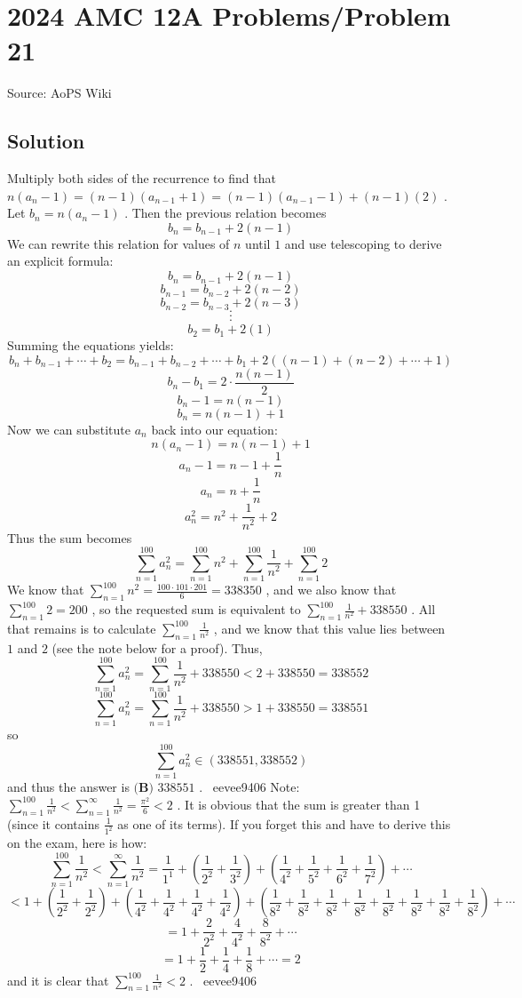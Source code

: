 \documentclass[12pt]{article}
\begin{document}
\section*{{2024 AMC 12A Problems/Problem 21}}
Source: AoPS Wiki

\subsection*{Solution}
Multiply both sides of the recurrence to find that $n(a_n-1)=(n-1)(a_{n-1}+1)=(n-1)(a_{n-1}-1)+(n-1)(2)$ . Let $b_n=n(a_n-1)$ . Then the previous relation becomes \[b_n=b_{n-1}+2(n-1)\] We can rewrite this relation for values of $n$ until $1$ and use telescoping to derive an explicit formula: \[b_n=b_{n-1}+2(n-1)\] \[b_{n-1}=b_{n-2}+2(n-2)\] \[b_{n-2}=b_{n-3}+2(n-3)\] \[\cdot\] \[\cdot\] \[\cdot\] \[b_2=b_1+2(1)\] Summing the equations yields: \[b_n+b_{n-1}+\cdots+b_2=b_{n-1}+b_{n-2}+\cdots+b_1+2((n-1)+(n-2)+\cdots+1)\] \[b_n-b_1=2\cdot\frac{n(n-1)}{2}\] \[b_n-1=n(n-1)\] \[b_n=n(n-1)+1\] Now we can substitute $a_n$ back into our equation: \[n(a_n-1)=n(n-1)+1\] \[a_n-1=n-1+\frac{1}{n}\] \[a_n=n+\frac{1}{n}\] \[a_n^2=n^2+\frac{1}{n^2}+2\] Thus the sum becomes \[\sum^{100}_{n=1} a_n^2= \sum^{100}_{n=1} n^2+ \sum^{100}_{n=1} \frac{1}{n^2}+ \sum^{100}_{n=1} 2\] We know that $\sum^{100}_{n=1} n^2=\frac{100\cdot101\cdot201}{6}=338350$ , and we also know that $\sum^{100}_{n=1} 2=200$ , so the requested sum is equivalent to $\sum^{100}_{n=1} \frac{1}{n^2}+338550$ . All that remains is to calculate $\sum^{100}_{n=1} \frac{1}{n^2}$ , and we know that this value lies between $1$ and $2$ (see the note below for a proof). Thus, \[\sum^{100}_{n=1} a_n^2= \sum^{100}_{n=1} \frac{1}{n^2}+338550<2+338550=338552\] \[\sum^{100}_{n=1} a_n^2= \sum^{100}_{n=1} \frac{1}{n^2}+338550>1+338550=338551\] so \[\sum^{100}_{n=1} a_n^2\in(338551,338552)\] and thus the answer is $\boxed{\textbf{(B) }338551}$ . ~eevee9406 Note: $\sum^{100}_{n=1} \frac{1}{n^2}< \sum^{\infty}_{n=1} \frac{1}{n^2}=\frac{\pi^2}{6}<2$ . It is obvious that the sum is greater than 1 (since it contains $\frac{1}{1^2}$ as one of its terms). If you forget this and have to derive this on the exam, here is how: \[\sum^{100}_{n=1} \frac{1}{n^2}<\sum^{\infty}_{n=1} \frac{1}{n^2}=\frac{1}{1^1}+\left(\frac{1}{2^2}+\frac{1}{3^2}\right)+\left(\frac{1}{4^2}+\frac{1}{5^2}+\frac{1}{6^2}+\frac{1}{7^2}\right)+\cdots\] \[<1+\left(\frac{1}{2^2}+\frac{1}{2^2}\right)+\left(\frac{1}{4^2}+\frac{1}{4^2}+\frac{1}{4^2}+\frac{1}{4^2}\right)+\left(\frac{1}{8^2}+\frac{1}{8^2}+\frac{1}{8^2}+\frac{1}{8^2}+\frac{1}{8^2}+\frac{1}{8^2}+\frac{1}{8^2}+\frac{1}{8^2}\right)+\cdots\] \[=1+\frac{2}{2^2}+\frac{4}{4^2}+\frac{8}{8^2}+\cdots\] \[=1+\frac{1}{2}+\frac{1}{4}+\frac{1}{8}+\cdots=2\] and it is clear that $\sum^{100}_{n=1} \frac{1}{n^2}<2$ . ~eevee9406
\end{document}
